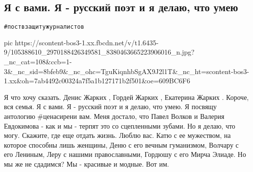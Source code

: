  
 
 
 
 
\subsection{Я с вами. Я - русский поэт и я делаю, что умею}
\label{sec:21_06_2020.fb.bilchenko_evgenia.1.zhurnalisty}
\verb|#поствзащитужурналистов|

\ifcmt
  pic https://scontent-bos3-1.xx.fbcdn.net/v/t1.6435-9/105388610_2970188426349581_8380463665223906016_n.jpg?_nc_cat=108&ccb=1-3&_nc_sid=8bfeb9&_nc_ohc=TguKiqnhbSgAX9J2l1T&_nc_ht=scontent-bos3-1.xx&oh=7ab4492c00324a7f5a1b127171b2f501&oe=609BC6F6
\fi

Я что хочу сказать. Денис Жарких , Гордей Жарких , Екатерина Жарких . Короче,
вся семья. Я с вами. Я - русский поэт и я делаю, что умею. Я посвящу антологию
#ценасирени вам. Меня достало, что Павел Волков и Валерия Евдокимова - как и мы
- терпят это со сцепленными зубами. Но я делаю, что могу. Скажите, где еще
отдать жизнь. Люблю вас. Катю с ее мужеством, на которое способны лишь женщины,
Деню с его вечным гуманизмом, Волчару с его Лениным, Леру с нашими
православными, Гордюшу с его Мирча Элиаде. Но мы же не сдадимся? Мы - красивые
и модные. Вот им.
